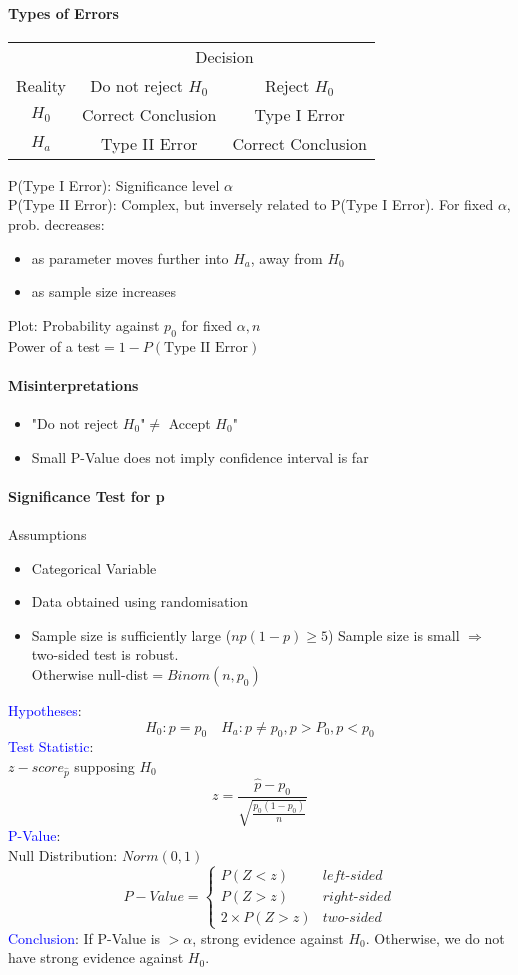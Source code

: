 \paragraph{Types of Errors}
\begin{tabular}{c c c}
	&\multicolumn{2}{c}{Decision}\\
	\cmidrule{2-3}
	Reality&Do not reject $H_0$&Reject $H_0$\\
	\midrule
	$H_0$&Correct Conclusion&Type I Error\\
	$H_a$&Type II Error&Correct Conclusion\\
\end{tabular}
\textcolor{Bittersweet}{P(Type I Error)}: Significance level $\alpha$\\
\textcolor{Bittersweet}{P(Type II Error)}: Complex, but inversely related to P(Type I Error). For fixed $\alpha$, prob. decreases:
\begin{itemize}
	\item as parameter moves further into $H_a$, away from $H_0$
	\item as sample size increases
\end{itemize}
Plot: Probability against $p_0$ for fixed $\alpha, n$\\
Power of a test$=1-P(\text{Type II Error})$
\paragraph{Misinterpretations}
\begin{itemize}
	\item "Do not reject $H_0$"$\neq$ \dq Accept $H_0$"\\
	\item Small P-Value does not imply confidence interval is far
\end{itemize}
\paragraph{Significance Test for p}
\textcolor{Bittersweet}{Assumptions}
\begin{itemize}
	\item Categorical Variable
	\item Data obtained using randomisation
	\item Sample size is sufficiently large ($np(1-p)\ge5$)
		Sample size is small $\Rightarrow$ two-sided test is robust.\\Otherwise null-dist$=Binom(n,p_0)$
\end{itemize}
\textcolor{Blue}{Hypotheses}:
\[H_0:p=p_0\quad H_a:p\neq p_0, p>P_0, p<p_0\]
\textcolor{Blue}{Test Statistic}:\\
$z-score_{\hat{p}}$ supposing $H_0$
\[z=\frac{\hat{p}-p_0}{\sqrt{\frac{p_0(1-p_0)}{n}}}\]
\textcolor{Blue}{P-Value}:\\
Null Distribution: $Norm(0,1)$
\[	P-Value=\begin{cases}
	P(Z<z)&left\text{-}sided\\
	P(Z>z)&right\text{-}sided\\
	2\times P(Z>z)&two\text{-}sided
	\end{cases}
\]
\textcolor{Blue}{Conclusion}:
If P-Value is $>\alpha$, strong evidence against $H_0$. Otherwise, we do not have strong evidence against $H_0$.
